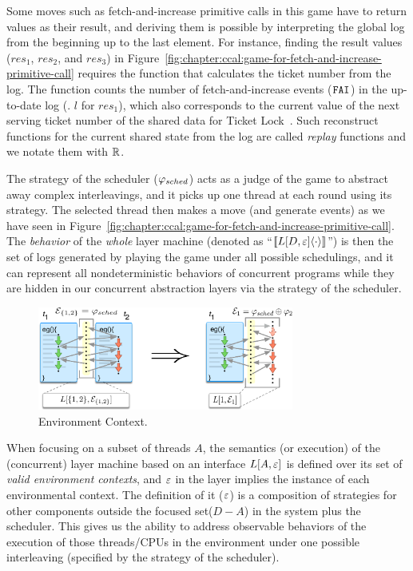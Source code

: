 Some moves such as fetch-and-increase primitive calls in this game have to return values as their result,
and deriving them is possible by interpreting the global log from the beginning up to the last element. 
For instance, finding the result values ($res_1$, $res_2$, and $res_3$) in Figure~\ref{fig:chapter:ccal:game-for-fetch-and-increase-primitive-call}
requires the function that calculates the ticket number from the log.
The function counts the number of fetch-and-increase events (${\mathrm{\texttt{FAI}}}$) in the up-to-date log (\eg. $l$ for $res_1$), which
also corresponds to the current value of the next serving ticket number of the shared data for Ticket Lock~\cite{lwn:ticketlocks}.
Such reconstruct functions for the current shared state from the log are called \emph{replay} functions and we notate them with $\mathbb{R}$.

The strategy of the scheduler ($\varphi_{sched}$) acts as a judge of the game to abstract away complex interleavings, 
and it picks up one thread at each round using its strategy. 
The selected thread then makes a move  (and generate events)  as we have seen in Figure~\ref{fig:chapter:ccal:game-for-fetch-and-increase-primitive-call}.
The \emph{behavior} of the \emph{whole} layer machine (denoted as ``$[\![{L[D, {\varepsilon}]} \langle {\cdot} \rangle]\!]$'') 
is then the set of  logs generated by playing the game under all possible schedulings, and it can represent all nondeterministic behaviors of concurrent programs 
while they are hidden in our concurrent abstraction layers via the strategy of the scheduler.

\begin{figure}[t]
\centering
\includegraphics[width=0.75\textwidth]{figs/ccal/pcomp}
\caption{Environment Context.}
\label{fig:chapter:ccal:env-contexs}
\end{figure}

When focusing on a subset of threads $A$, the semantics (or execution) of the (concurrent) layer machine based on an
interface $L[A, {\varepsilon}]$ is defined over its set of \emph{valid environment
contexts}, and ${\varepsilon}$ in the layer implies the instance of each environmental context.
The definition of it (${\varepsilon}$) is
a composition  of strategies for other components outside  the focused set($D - A$) in the 
system plus the scheduler.
This gives us the ability to address observable behaviors of the
execution of those threads/CPUs in the environment under one possible
interleaving (specified by the strategy of the scheduler).

